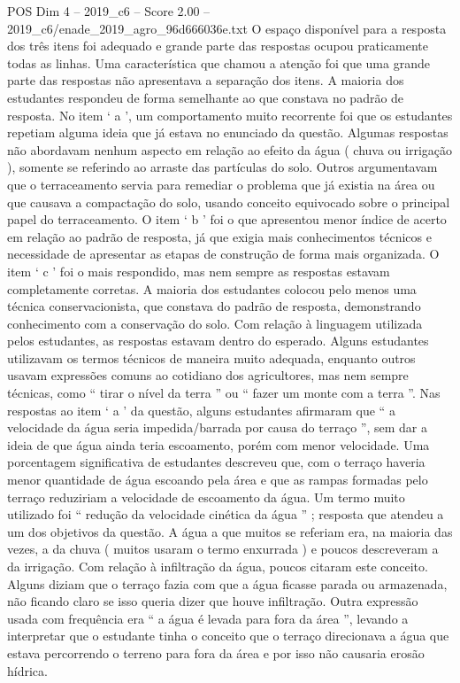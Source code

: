\begin{textsample}{POS Dim 4 – 2019\_c6 – Score 2.00 – 2019\_c6/enade\_2019\_agro\_96d666036e.txt}
O espaço disponível para a resposta dos três itens foi adequado e grande parte das respostas ocupou praticamente todas as linhas.
Uma característica que chamou a atenção foi que uma grande parte das respostas não apresentava a separação dos itens.
A maioria dos estudantes respondeu de forma semelhante ao que constava no padrão de resposta.
No item ‘ a ’, um comportamento muito recorrente foi que os estudantes repetiam alguma ideia que já estava no enunciado da questão.
Algumas respostas não abordavam nenhum aspecto em relação ao efeito da água ( chuva ou irrigação ), somente se referindo ao arraste das partículas do solo.
Outros argumentavam que o terraceamento servia para remediar o problema que já existia na área ou que causava a compactação do solo, usando conceito equivocado sobre o principal papel do terraceamento.
O item ‘ b ’ foi o que apresentou menor índice de acerto em relação ao padrão de resposta, já que exigia mais conhecimentos técnicos e necessidade de apresentar as etapas de construção de forma mais organizada.
O item ‘ c ’ foi o mais respondido, mas nem sempre as respostas estavam completamente corretas.
A maioria dos estudantes colocou pelo menos uma técnica conservacionista, que constava do padrão de resposta, demonstrando conhecimento com a conservação do solo.
Com relação à linguagem utilizada pelos estudantes, as respostas estavam dentro do esperado.
Alguns estudantes utilizavam os termos técnicos de maneira muito adequada, enquanto outros usavam expressões comuns ao cotidiano dos agricultores, mas nem sempre técnicas, como “ tirar o nível da terra ” ou “ fazer um monte com a terra ”.
Nas respostas ao item ‘ a ’ da questão, alguns estudantes afirmaram que “ a velocidade da água seria impedida/barrada por causa do terraço ”, sem dar a ideia de que água ainda teria escoamento, porém com menor velocidade.
Uma porcentagem significativa de estudantes descreveu que, com o terraço haveria menor quantidade de água escoando pela área e que as rampas formadas pelo terraço reduziriam a velocidade de escoamento da água.
Um termo muito utilizado foi “ redução da velocidade cinética da água ” ; resposta que atendeu a um dos objetivos da questão.
A água a que muitos se referiam era, na maioria das vezes, a da chuva ( muitos usaram o termo enxurrada ) e poucos descreveram a da irrigação.
Com relação à infiltração da água, poucos citaram este conceito.
Alguns diziam que o terraço fazia com que a água ficasse parada ou armazenada, não ficando claro se isso queria dizer que houve infiltração.
Outra expressão usada com frequência era “ a água é levada para fora da área ”, levando a interpretar que o estudante tinha o conceito que o terraço direcionava a água que estava percorrendo o terreno para fora da área e por isso não causaria erosão hídrica.

\end{textsample}
